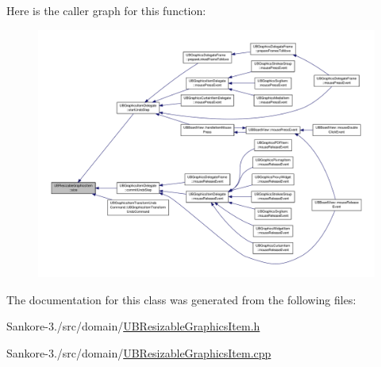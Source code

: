 Here is the caller graph for this function\-:
\nopagebreak
\begin{figure}[H]
\begin{center}
\leavevmode
\includegraphics[width=350pt]{d7/dad/class_u_b_resizable_graphics_item_a97d0d97df113d870f0e463ace0b050c7_icgraph}
\end{center}
\end{figure}




The documentation for this class was generated from the following files\-:\begin{DoxyCompactItemize}
\item 
Sankore-\/3./src/domain/\hyperlink{_u_b_resizable_graphics_item_8h}{U\-B\-Resizable\-Graphics\-Item.\-h}\item 
Sankore-\/3./src/domain/\hyperlink{_u_b_resizable_graphics_item_8cpp}{U\-B\-Resizable\-Graphics\-Item.\-cpp}\end{DoxyCompactItemize}

